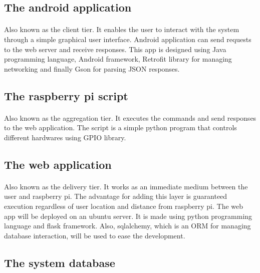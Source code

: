 \documentclass[12pt, oneside, a4paper]{book}
\begin{document}
		\subsection{The android application}
		\paragraph{} Also known as the client tier. It enables the user to interact with the system through a simple graphical user interface. Android application can send requests to the web server and receive responses. This app is designed using Java programming language, Android framework, Retrofit library for managing networking and finally Gson for parsing JSON responses.
		\subsection{The raspberry pi script}
		\paragraph{} Also known as the aggregation tier. It executes the commands and send responses to the web application. The script is a simple python program that controls different hardwares using GPIO library. 
		\subsection{The web application}
		\paragraph{} Also known as the delivery tier. It works as an immediate medium between the user and raspberry pi. The advantage for adding this layer is guaranteed execution regardless of user location and distance from raspberry pi. The web app will be deployed on an ubuntu server. It is made using python programming language and flask framework. Also, sqlalchemy, which is an ORM for managing database interaction, will be used to ease the development. 
		\subsection{The system database}
\end{document}

